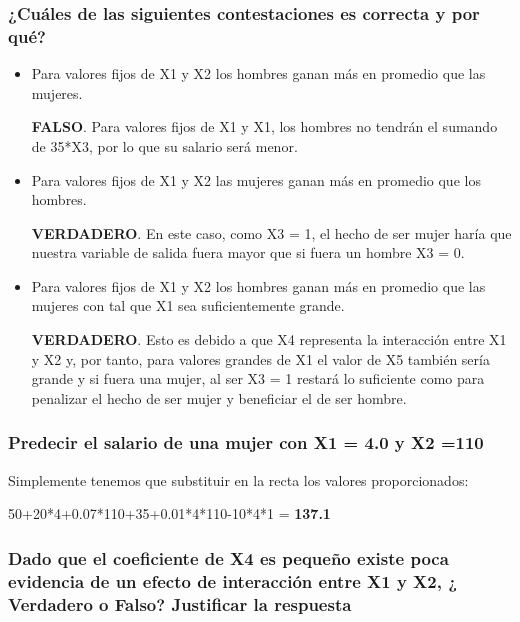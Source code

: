 \subsubsection{¿Cuáles de las siguientes contestaciones es correcta y por qué?}

\begin{itemize}

\item Para valores fijos de X1 y X2 los hombres ganan más en promedio que las mujeres.

\textbf{FALSO}. Para valores fijos de X1 y X1, los hombres no tendrán el sumando de 35*X3, por lo que su salario será menor. 

\item Para valores fijos de X1 y X2 las mujeres ganan más en promedio que los hombres.

\textbf{VERDADERO}. En este caso, como X3 = 1, el hecho de ser mujer haría que nuestra variable de salida fuera mayor que si fuera un hombre X3 = 0.


\item Para valores fijos de X1 y X2 los hombres ganan más en promedio que las mujeres con tal que X1 sea suficientemente grande.

\textbf{VERDADERO}. Esto es debido a que X4 representa la interacción entre X1 y X2 y, por tanto, para valores grandes de X1 el valor de X5 también sería grande y si fuera una mujer, al ser X3 = 1 restará lo suficiente como para penalizar el hecho de ser mujer y beneficiar el de ser hombre.

\end{itemize}

\subsubsection{Predecir el salario de una mujer con X1 = 4.0 y X2 =110}

Simplemente tenemos que substituir en la recta los valores proporcionados:\\

\begin{center}50+20*4+0.07*110+35+0.01*4*110-10*4*1 = \textbf{137.1}\end{center}
\newpage
\subsubsection{Dado que el coeficiente de X4 es pequeño existe poca evidencia de un efecto de
interacción entre X1 y X2, ¿ Verdadero o Falso? Justificar la respuesta}

